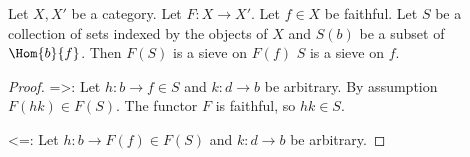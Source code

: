\begin{lemma}
Let $X, X'$ be a category.
Let $F:X\rightarrow X'$.
Let $f\in X$ be faithful.
Let $S$ be a collection of sets indexed by the objects of $X$
and $S(b)$ be a subset of $\Hom{b}{f}$.
Then $F(S)$ is a sieve on $F(f)$ \iff $S$ is a sieve on $f$.
\end{lemma}

\begin{proof}
=>:
Let $h: b \rightarrow f \in S$ 
and $k: d \rightarrow b$ be arbitrary.
By assumption $F(hk)\in F(S)$.
The functor $F$ is faithful, so $hk \in S$.

<=:
Let $h: b \rightarrow F(f) \in F(S)$ 
and $k: d \rightarrow b$ be arbitrary.
\end{proof}